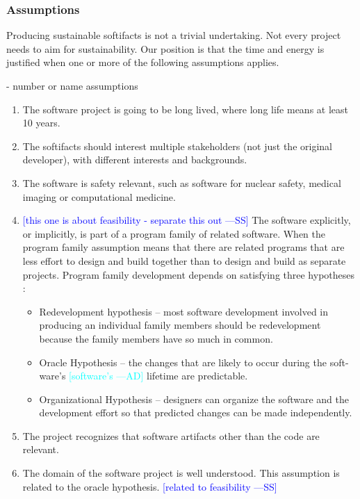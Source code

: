 \documentclass[12pt]{article}
\newcommand{\authornote}[3]{\textcolor{#1}{[#3 ---#2]}}
\newcommand{\authornote}[3]{}
\newcommand{\wss}[1]{\authornote{blue}{SS}{#1}} %
\newcommand{\ad}[1]{\authornote{cyan}{AD}{#1}} %
\begin{document}
\subsubsection*{Assumptions}

Producing sustainable softifacts is not a trivial undertaking.  Not
every project needs to aim for sustainability.  Our position is that the time
and energy is justified when one or more of the following assumptions applies.

- number or name assumptions

\begin{enumerate}
\item The software project is going to be long lived, where long life means at
  least 10 years.
\item The softifacts should interest multiple stakeholders (not just the
  original developer), with different interests and backgrounds.
\item The software is safety relevant, such as software for nuclear safety,
  medical imaging or computational medicine.
\item \wss{this one is about feasibility - separate this out} The software explicitly, or implicitly, is part of a program family of
  related software.  When the program family assumption means that there are
  related programs that are less effort to design and build together than to
  design and build as separate projects.  Program family development depends on
  satisfying three hypotheses \citep{Weiss1997}:
\begin{itemize}
\item Redevelopment hypothesis – most software development involved in producing
  an individual family members should be redevelopment because the family
  members have so much in common.
\item Oracle Hypothesis – the changes that are likely to occur during the soft-
  ware’s \ad{software's} lifetime are predictable.
\item Organizational Hypothesis – designers can organize the software and the
  development effort so that predicted changes can be made independently.
\end{itemize}
\item The project recognizes that software artifacts other than the code are
  relevant.
\item The domain of the software project is well understood.  This assumption is
  related to the oracle hypothesis. \wss{related to feasibility}
\end{enumerate}
\end{document}
